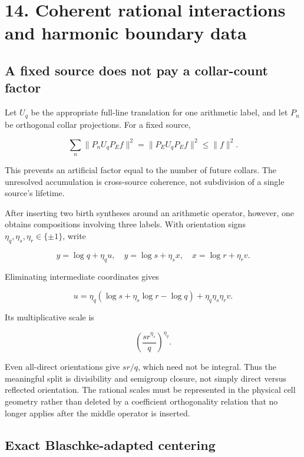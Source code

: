 \documentclass[
  10pt,
  a4paper,
  10pt,
  oneside,
  openany]{book}
\begin{document}
\section{14. Coherent rational interactions and harmonic boundary
data}\label{ch-rational}

\subsection{A fixed source does not pay a collar-count
factor}\label{a-fixed-source-does-not-pay-a-collar-count-factor}

Let \(U_q\) be the appropriate full-line translation for one arithmetic
label, and let \(P_n\) be orthogonal collar projections. For a fixed
source,

\[
\sum_n\|P_nU_qP_Ef\|^2=\|P_EU_qP_Ef\|^2\le\|f\|^2.
\tag{14.1}\label{eq:14.1}
\]

This prevents an artificial factor equal to the number of future
collars. The unresolved accumulation is cross-source coherence, not
subdivision of a single source's lifetime.

After inserting two birth syntheses around an arithmetic operator,
however, one obtains compositions involving three labels. With
orientation signs \(\eta_q,\eta_s,\eta_r\in\{\pm1\}\), write

\[
y=\log q+\eta_qu,
\quad y=\log s+\eta_sx,
\quad x=\log r+\eta_rv.
\tag{14.2}\label{eq:14.2}
\]

Eliminating intermediate coordinates gives

\[
u=\eta_q(\log s+\eta_s\log r-\log q)
+\eta_q\eta_s\eta_rv.
\tag{14.3}\label{eq:14.3}
\]

Its multiplicative scale is

\[
\left(\frac{s r^{\eta_s}}q\right)^{\eta_q}.
\tag{14.4}\label{eq:14.4}
\]

Even all-direct orientations give \(sr/q\), which need not be integral.
Thus the meaningful split is divisibility and semigroup closure, not
simply direct versus reflected orientation. The rational scales must be
represented in the physical cell geometry rather than deleted by a
coefficient orthogonality relation that no longer applies after the
middle operator is inserted.

\subsection{Exact Blaschke-adapted
centering}\label{exact-blaschke-adapted-centering}
\end{document}
